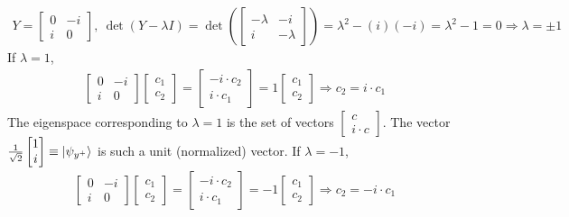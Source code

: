 \begin{align*}
	Y = \begin{bmatrix}
	0 & -i \\
	i & 0
	\end{bmatrix},\ \det(Y-\lambda I) =
	\det \left(\begin{bmatrix}
	-\lambda & -i \\
	i & -\lambda
	\end{bmatrix} \right) = \lambda^2-(i)(-i)=\lambda^2 - 1 = 0 \Rightarrow \lambda = \pm 1
\end{align*}
If $\lambda = 1$,
\begin{align*}
	\begin{bmatrix}
		0 & -i \\
		i & 0
	\end{bmatrix}
	\begin{bmatrix}
		c_1 \\
		c_2
	\end{bmatrix} =
	\begin{bmatrix}
	      -i\cdot c_2 \\
	      i\cdot c_1
	\end{bmatrix} =
	 1
	\begin{bmatrix}
		c_1 \\
		c_2
	\end{bmatrix}
	\Rightarrow c_2 = i\cdot c_1
\end{align*}
The eigenspace corresponding to $\lambda = 1$ is the set of vectors $\begin{bmatrix}c \\ i\cdot c\end{bmatrix}$.  The vector $\frac{1}{\sqrt{2}}\begin{bmatrix} 1 \\ i\end{bmatrix}\equiv\ket{\psi_{y^+}}$ is such a unit (normalized) vector. 
If $\lambda = -1$,
\begin{align*}
	\begin{bmatrix}
		0 & -i \\
		i & 0
	\end{bmatrix}
	\begin{bmatrix}
		c_1 \\
		c_2
	\end{bmatrix} =
	\begin{bmatrix}
	      -i\cdot c_2 \\
	      i\cdot c_1
	\end{bmatrix} =
	 -1
	\begin{bmatrix}
		c_1 \\
		c_2
	\end{bmatrix}
	\Rightarrow c_2 = -i\cdot c_1
\end{align*}
